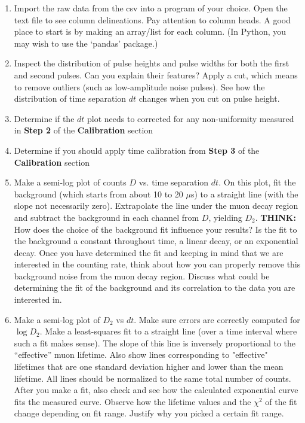 \documentclass{../lab}
\begin{document}
\begin{enumerate}
    \item Import the raw data from the csv into a program of your choice. Open the text file to see column delineations. Pay attention to column heads. A good place to start is by making an array/list for each column. (In Python, you may wish to use the `pandas' package.)

    \item Inspect the distribution of pulse heights and pulse widths for both the first and second pulses. Can you explain their features? Apply a cut, which means to remove outliers (such as low-amplitude noise pulses). See how the distribution of time separation $dt$ changes when you cut on pulse height.

    \item Determine if the $dt$ plot needs to corrected for any non-uniformity measured in \textbf{Step 2} of the \textbf{Calibration} section

    \item Determine if you should apply time calibration from \textbf{Step 3} of the \textbf{Calibration} section

    \item Make a semi-log plot of counts $D$ vs. time separation $dt$. On this plot, fit the background (which starts from about 10 to 20 $\mu $s) to a straight line (with the slope not necessarily zero). Extrapolate the line under the muon decay region and subtract the background in each channel from $D$, yielding $D_2$. \textbf{THINK:} How does the choice of the background fit influence your results? Is the fit to the background a constant throughout time, a linear decay, or an exponential decay. Once you have determined the fit and keeping in mind that we are interested in the counting rate, think about how you can properly remove this background noise from the muon decay region. Discuss what could be determining the fit of the background and its correlation to the data you are interested in.

    \item Make a semi-log plot of $D_2$ vs $dt$. Make sure errors are correctly computed for $\log D_2$. Make a least-squares fit to a straight line (over a time interval where such a fit makes sense). The slope of this line is inversely proportional to the ``effective'' muon lifetime. Also show lines corresponding to "effective" lifetimes that are one standard deviation higher and lower than the mean lifetime. All lines should be normalized to the same total number of counts. After you make a fit, also check and see how the calculated exponential curve fits the measured curve. Observe how the lifetime values and the $\chi^2$ of the fit change depending on fit range. Justify why you picked a certain fit range.


\end{enumerate}
\end{document}
